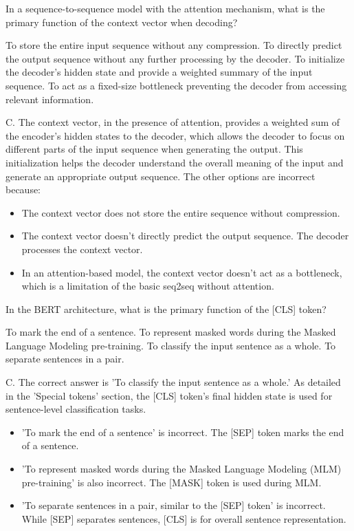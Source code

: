 \documentclass[11pt,addpoints,answers]{exam}
\begin{document}
\begin{questions}
\question[1] In a sequence-to-sequence model with the attention mechanism, what is the primary function of the context vector when decoding?
  \begin{choices}
    \choice To store the entire input sequence without any compression.
    \choice To directly predict the output sequence without any further processing by the decoder.
    \choice To initialize the decoder's hidden state and provide a weighted summary of the input sequence.
    \choice To act as a fixed-size bottleneck preventing the decoder from accessing relevant information.
  \end{choices}
\begin{solution}
C. The context vector, in the presence of attention, provides a weighted sum of the encoder's hidden states to the decoder, which allows the decoder to focus on different parts of the input sequence when generating the output. This initialization helps the decoder understand the overall meaning of the input and generate an appropriate output sequence. The other options are incorrect because:
  \begin{itemize}
    \item The context vector does not store the entire sequence without compression.
    \item The context vector doesn't directly predict the output sequence. The decoder processes the context vector.
    \item In an attention-based model, the context vector doesn't act as a bottleneck, which is a limitation of the basic seq2seq without attention.
  \end{itemize}
\end{solution}

\question[1] In the BERT architecture, what is the primary function of the [CLS] token?
  \begin{choices}
    \choice To mark the end of a sentence.
    \choice To represent masked words during the Masked Language Modeling pre-training.
    \choice To classify the input sentence as a whole.
    \choice To separate sentences in a pair.
  \end{choices}
\begin{solution}
  C. The correct answer is 'To classify the input sentence as a whole.' As detailed in the 'Special tokens' section, the [CLS] token's final hidden state is used for sentence-level classification tasks.
  \begin{itemize}
    \item 'To mark the end of a sentence' is incorrect. The [SEP] token marks the end of a sentence.
    \item 'To represent masked words during the Masked Language Modeling (MLM) pre-training' is also incorrect. The [MASK] token is used during MLM.
    \item 'To separate sentences in a pair, similar to the [SEP] token' is incorrect. While [SEP] separates sentences, [CLS] is for overall sentence representation.
  \end{itemize}
\end{solution}


\end{questions}
\end{document}

